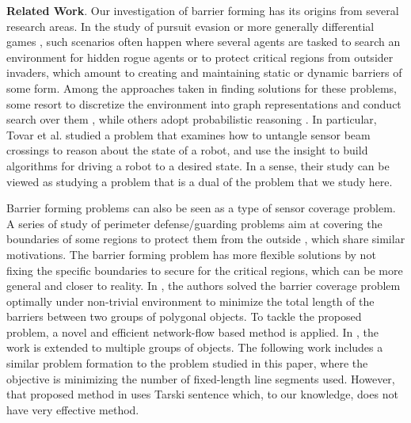\noindent\textbf{Related Work}.
Our investigation of barrier forming has its origins from several research areas.
In the study of pursuit evasion or more generally differential games \cite{ho1965differential,isaacs1999differential,hajek2008pursuit,tovar2009sensor,simov2000pursuit,guibas1997visibility,kameda2006online,kirousis1986searching, sachs2004visibility,lau2005optimal, yu2011shadow, olsen2022robust}, 
such scenarios often happen where several agents are tasked to search an environment for hidden rogue agents or to protect critical regions from outsider invaders, which amount to creating and maintaining static or dynamic barriers of some form.  
%
Among the approaches taken in finding solutions for these problems, some resort to discretize the environment into graph representations and conduct search over them \cite{kirousis1986searching, sachs2004visibility}, while others adopt probabilistic reasoning \cite{lau2005optimal, yu2011shadow}. 
%
In particular, Tovar et al. \cite{tovar2009sensor} studied a problem that examines how to untangle sensor beam crossings to reason about the state of a robot, and use the insight to build algorithms for driving a robot to a desired state. In a sense, their study can be viewed as studying a problem that is a dual of the problem that we study here. 


Barrier forming problems can also be seen as a type of sensor coverage problem. 
%
A series of study of perimeter defense/guarding problems aim at covering the boundaries of some regions to protect them from the outside \cite{shishika2020cooperative, macharet2020adaptive, fenghangaoyu2019efficient, fengyu2020optimally}, which share similar motivations. 
The barrier forming problem has more flexible solutions by not fixing the specific boundaries to secure for the critical regions,
which can be more general and closer to reality.
In \cite{kloder2007barrier}, the authors solved the barrier coverage problem optimally under non-trivial environment to minimize the total length of the barriers between two groups of polygonal objects. 
To tackle the proposed problem, a novel and efficient network-flow based method is applied. 
In \cite{abrahamsen2020geometric}, the work is extended to multiple groups of objects.
The following work \cite{kloder2008thesis} includes a similar problem formation to the problem studied in this paper, where the objective is minimizing the number of fixed-length line segments used. 
%
However, that proposed method in \cite{kloder2008thesis} uses Tarski sentence \cite{tarski1949decision} which, to our knowledge, does not have very effective method.


